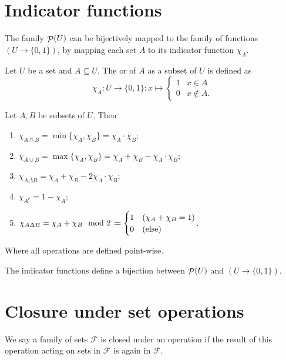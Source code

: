 \section{Indicator functions}
The family $\mathop{\mathcal{P}}(U)$ can be bijectively mapped to the family of functions $(U\to \{0,1\})$, by mapping each set $A$ to its indicator function $\chi_A$.

\begin{definition}
Let $U$ be a set and $A\subseteq U$. The  or  of $A$ as a subset of $U$ is defined as
\[ \chi_A: U\to \{0,1\}: x\mapsto \begin{cases}
1 & x\in A \\ 0 & x\notin A.
\end{cases} \]
\end{definition}
\begin{lemma}
Let $A,B$ be subsets of $U$. Then
\begin{enumerate}
\item $\chi_{A\cap B} = \min\{\chi_A,\chi_B\} = \chi_A\cdot \chi_B$;
\item $\chi_{A\cup B} = \max\{\chi_A,\chi_B\} = \chi_A + \chi_B - \chi_A\cdot \chi_B$;
\item $\chi_{A\Delta B} = \chi_A + \chi_B - 2\chi_A\cdot \chi_B$;
\item $\chi_{A^c} = 1-\chi_A$;
\item $\chi_{A\Delta B} = \chi_A + \chi_B \mod 2 \coloneqq \begin{cases}
1 & (\chi_A + \chi_B = 1) \\
0 & \text{(else)}
\end{cases}$.
\end{enumerate}
Where all operations are defined point-wise.
\end{lemma}

\begin{proposition}
The indicator functions define a bijection between $\mathop{\mathcal{P}}(U)$ and $(U\to \{0,1\})$.
\end{proposition}

\section{Closure under set operations}
We say a family of sets $\mathcal{F}$ is closed under an operation if the result of this operation acting on sets in $\mathcal{F}$ is again in $\mathcal{F}$.

